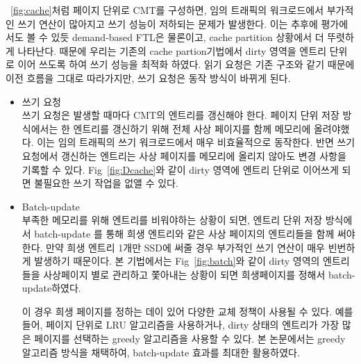 \documentclass[conference]{IEEEtran}
\begin{document}
~\ref{fig:cache}처럼 페이지 단위로 CMT를 구성하면, 임의 트래픽의 워크로드에서 부가적인 쓰기 연산이
많아지고 쓰기 성능이 저하되는 문제가 발생한다. 이는 추후에 평가에서도 볼 수 있듯 demand-based FTL은
물론이고, cache partition 상황에서 더 뚜렷하게 나타난다. 때문에 우리는 기존의 cache partion기법에서 
dirty 영역을 엔트리 단위로 이어 쓰도록 하여 쓰기 성능을 최적화 하였다. 읽기 요청은 기존 구조와 같기
때문에 이전 흐름을 그대로 따라가지만, 쓰기 요청은 동작 방식이 바뀌게 된다.

\begin{itemize}
	\item{쓰기 요청}\\
	쓰기 요청은 발생할 때마다 CMT의 엔트리를 갱신해야 한다. 페이지 단위 저장 방식에서는 한 엔트리를
	갱신하기 위해 전체 사상 페이지를 함께 메모리에 올려야했다. 이는 임의 트래픽의 쓰기 워크로드에서
	매우 비효율적으로 동작한다. 반면 쓰기 요청에서 갱신하는 엔트리는 사상 페이지를 메모리에 올리지 
	않아도 변경 사항을 기록할 수 있다. Fig~\ref{fig:Dcache}와 같이 dirty 영역에 엔트리 단위로 
	이어쓰게 되면 불필요한 쓰기 작업을 없앨 수 있다. 
	\item{Batch-update}\\
	부족한 메모리를 위해 엔트리를 비워야하는 상황이 되면, 엔트리 단위 저장 방식에서 batch-update 를
	통해 희생 엔트리와 같은 사상 페이지의 엔트리들을 함께 써야 한다. 만약 희생 엔트리 1개만 SSD에 
	써줄 경우 부가적인 쓰기 연산이 매우 빈번하게 발생하기 때문이다. 본 기법에서는 
	Fig~\ref{fig:batch}와 같이 dirty 영역의 엔트리들을 사상페이지 별로 관리하고 쫓아내는 상황이 
	되면 희생페이지를 정해서 batch-update하였다.\par

	이 경우 희생 페이지를 정하는 데이 있어 다양한 교체 정책이 사용될 수 있다. 예를 들어, 
	페이지 단위로 LRU 알고리즘을 사용하거나, dirty 상태의 엔트리가 가장 많은 페이지를 선택하는 
	greedy 알고리즘을 사용할 수 있다. 본 논문에서는 greedy 알고리즘 방식을 채택하여, 
	batch-update 효과를 최대한 활용하였다.
\end{itemize}
\end{document}
